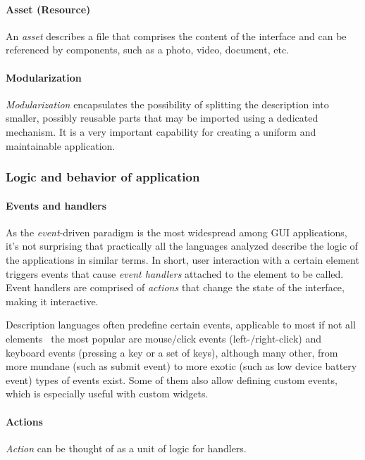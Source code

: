 \paragraph{Asset (Resource)}
An \emph{asset} describes a file that comprises the content of the interface and can be referenced by components, such as a photo, video, document, etc.

\paragraph{Modularization}
\emph{Modularization} encapsulates the possibility of splitting the description into smaller, possibly reusable parts that may be imported using a dedicated mechanism.
It is a very important capability for creating a uniform and maintainable application.

\subsubsection{Logic and behavior of application}

\paragraph{Events and handlers}
As the \emph{event}-driven paradigm is the most widespread among GUI applications, it's not surprising that practically all the languages analyzed describe the logic of the applications in similar terms.
In short, user interaction with a certain element triggers events that cause \emph{event handlers} attached to the element to be called.
Event handlers are comprised of \emph{actions} that change the state of the interface, making it interactive.

Description languages often predefine certain events, applicable to most if not all elements \textendash\ the most popular are mouse/click events (left-/right-click) and keyboard events (pressing a key or a set of keys), although many other, from more mundane (such as submit event) to more exotic (such as low device battery event) types of events exist.
Some of them also allow defining custom events, which is especially useful with custom widgets.

\paragraph{Actions}
\emph{Action} can be thought of as a unit of logic for handlers.


